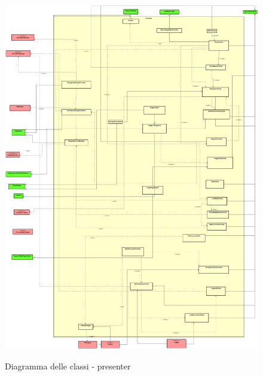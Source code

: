 \documentclass[../DefinizioneDiProdotto.tex,lanscape]{subfiles}
\begin{document}
\begin{figure}[H]
	\includegraphics[width=\textwidth]{diagrams/ModelCompleteNoMethods/PNGpackage/presenter}
	\label{presenterPackage}
	\caption{Diagramma delle classi - presenter}
\end{figure}
\end{document}
